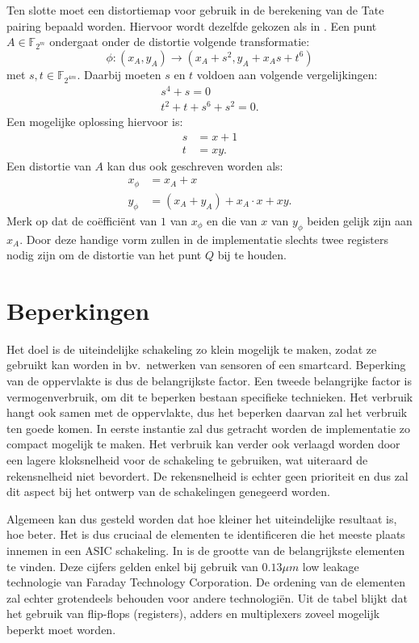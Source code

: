 Ten slotte moet een distortiemap voor gebruik in de berekening van de Tate pairing bepaald worden. Hiervoor wordt dezelfde gekozen als in \cite{bertoni}. Een punt $A \in \mathbb{F}_{2^m}$ ondergaat onder de distortie volgende transformatie:
\[\phi : (x_A, y_A) \to (x_A + s^2, y_A + x_A s + t^6)\]
met $s, t \in \mathbb{F}_{2^{4m}}$. Daarbij moeten $s$ en $t$ voldoen aan volgende vergelijkingen:
\[\begin{gathered}
s^4 + s = 0\\
t^2 + t + s^6 + s^2 = 0.
\end{gathered}\]
Een mogelijke oplossing hiervoor is:
\[\begin{aligned}
s	&= x + 1\\
t	&= xy.
\end{aligned}\]
Een distortie van $A$ kan dus ook geschreven worden als:
\[\begin{aligned}
x_\phi	&= x_A + x\\
y_\phi	&= (x_A + y_A) + x_A \cdot x + xy.
\end{aligned}\]
Merk op dat de co\"effici\"ent van $1$ van $x_\phi$ en die van $x$ van $y_\phi$ beiden gelijk zijn aan $x_A$. Door deze handige vorm zullen in de implementatie slechts twee registers nodig zijn om de distortie van het punt $Q$ bij te houden.

\section{Beperkingen\label{sectie-implementatie-beperkingen}}

Het doel is de uiteindelijke schakeling zo klein mogelijk te maken, zodat ze gebruikt kan worden in bv.\ netwerken van sensoren of een smartcard. Beperking van de oppervlakte is dus de belangrijkste factor. Een tweede belangrijke factor is vermogenverbruik, om dit te beperken bestaan specifieke technieken. Het verbruik hangt ook samen met de oppervlakte, dus het beperken daarvan zal het verbruik ten goede komen. In eerste instantie zal dus getracht worden de implementatie zo compact mogelijk te maken. Het verbruik kan verder ook verlaagd worden door een lagere kloksnelheid voor de schakeling te gebruiken, wat uiteraard de rekensnelheid niet bevordert. De rekensnelheid is echter geen prioriteit en dus zal dit aspect bij het ontwerp van de schakelingen genegeerd worden.

Algemeen kan dus gesteld worden dat hoe kleiner het uiteindelijke resultaat is, hoe beter. Het is dus cruciaal de elementen te identificeren die het meeste plaats innemen in een ASIC schakeling. In  is de grootte van de belangrijkste elementen te vinden. Deze cijfers gelden enkel bij gebruik van $0.13 \mu m$ low leakage technologie van Faraday Technology Corporation. De ordening van de elementen zal echter grotendeels behouden voor andere technologi\"en. Uit de tabel blijkt dat het gebruik van flip-flops (registers), adders en multiplexers zoveel mogelijk beperkt moet worden.

